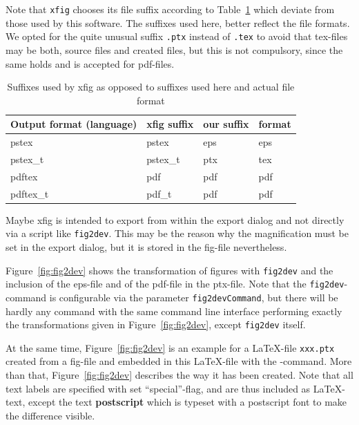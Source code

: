 \documentclass[12pt]{book}
\begin{document}
Note that \texttt{xfig} chooses its file suffix 
according to Table~\ref{tab:xfigSuffixes} 
which deviate from those used by this software. 
The suffixes used here, 
better reflect the file formats. 
We opted for the quite unusual suffix \texttt{.ptx} 
instead of \texttt{.tex} 
to avoid that tex-files may be both, 
source files and created files, 
but this is not compulsory, 
since the same holds and is accepted for pdf-files. 

\begin{longtable}{|l|lll|}
\toprule
Output format (language) & xfig suffix & our suffix & format \\
\midrule
\midrule
\endfirsthead%
\bottomrule%
\caption{\label{tab:xfigSuffixes} Suffixes used by xfig as opposed to suffixes
  used here and actual file format }
\endlastfoot%
pstex                    & pstex       & eps        & eps \\
pstex\_t                 & pstex\_t    & ptx        & tex \\
pdftex                   & pdf         & pdf        & pdf \\
pdftex\_t                & pdf\_t      & pdf        & pdf \\
\end{longtable}


Maybe xfig is intended to export from within the export dialog 
and not directly via a script like \texttt{fig2dev}. 
This may be the reason 
why the magnification must be set in the export dialog, 
but it is stored in the fig-file nevertheless. 

Figure~\ref{fig:fig2dev} shows the transformation 
of figures with \texttt{fig2dev} 
and the inclusion of the eps-file and of the pdf-file in the ptx-file. 
Note that the \texttt{fig2dev}-command is configurable 
via the parameter \texttt{fig2devCommand}, 
but there will be hardly any command with the same command line interface 
performing exactly the transformations given in Figure~\ref{fig:fig2dev}, 
except \texttt{fig2dev} itself. 

At the same time, Figure~\ref{fig:fig2dev} is an example 
for a \LaTeX-file \texttt{xxx.ptx} created from a fig-file 
and embedded in this \LaTeX-file 
with the -command. 
More than that, 
Figure~\ref{fig:fig2dev} describes the way it has been created. 
Note that all text labels are specified with set ``special''-flag, 
and are thus included as \LaTeX-text, 
except the text \textbf{\tiny postscript} 
which is typeset with a postscript font to make the difference visible. 
\end{document}
